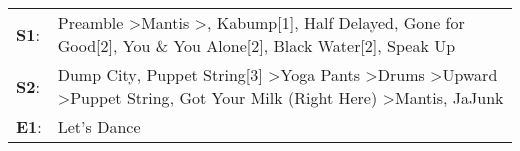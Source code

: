 \begin{supertabular}{p{0.03\textwidth}p{0.92\textwidth}}
 \textbf{S1}:  &                                       Preamble\textsuperscript{} \textgreater \enspace Mantis\textsuperscript{} \textgreater {}\textsuperscript{}, \enspace Kabump[1]\textsuperscript{}, \enspace Half Delayed\textsuperscript{}, \enspace Gone for Good[2]\textsuperscript{}, \enspace You \& You Alone[2]\textsuperscript{}, \enspace Black Water[2]\textsuperscript{}, \enspace Speak Up\textsuperscript{}  \enspace  \\
 \textbf{S2}:  &  Dump City\textsuperscript{}, \enspace Puppet String[3]\textsuperscript{} \textgreater \enspace Yoga Pants\textsuperscript{} \textgreater \enspace Drums\textsuperscript{} \textgreater \enspace Upward\textsuperscript{} \textgreater \enspace Puppet String\textsuperscript{}, \enspace Got Your Milk (Right Here)\textsuperscript{} \textgreater \enspace Mantis\textsuperscript{}, \enspace JaJunk\textsuperscript{}  \enspace  \\
 \textbf{E1}:  &                                                                                                                                                                                                                                                                                                                                                                                            Let's Dance\textsuperscript{}  \enspace  \\
\end{supertabular}
